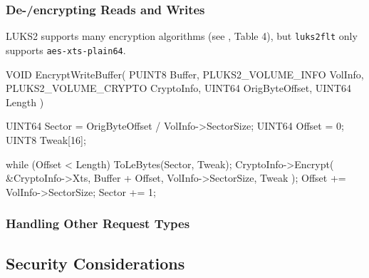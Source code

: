 \subsubsection{De-/encrypting Reads and Writes}
\label{chap:ourapproach.final.de_encrypting}


LUKS2 supports many encryption algorithms (see \cite{Broz2018}, Table 4), but \texttt{luks2flt} only supports \texttt{aes-xts-plain64}.

\begin{ccode}
VOID
EncryptWriteBuffer(
    PUINT8 Buffer,
    PLUKS2_VOLUME_INFO VolInfo,
    PLUKS2_VOLUME_CRYPTO CryptoInfo,
    UINT64 OrigByteOffset,
    UINT64 Length
)
{
    UINT64 Sector = OrigByteOffset / VolInfo->SectorSize;
    UINT64 Offset = 0;
    UINT8 Tweak[16];

    while (Offset < Length) {
        ToLeBytes(Sector, Tweak);
        CryptoInfo->Encrypt(
            &CryptoInfo->Xts, Buffer + Offset,
            VolInfo->SectorSize, Tweak
        );
        Offset += VolInfo->SectorSize;
        Sector += 1;
    }
}
\end{ccode}

\subsubsection{Handling Other Request Types}
\label{chap:ourapproach.final.otherrequests}

\subsection{Security Considerations}
\label{chap:ourapproach.security}





